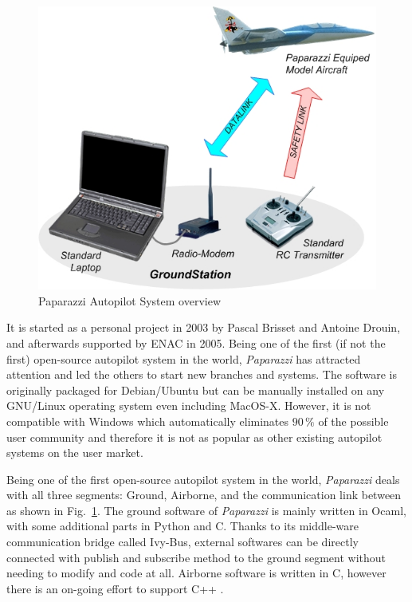 \begin{figure}[!hbt]
\begin{center}
\includegraphics[width=11.3cm]{figures/Paparazzi_System_overview}
\caption{Paparazzi Autopilot System overview} 
\label{fig:Paparazzi_System_overview}
\end{center}
\end{figure}

It is started as a personal project in 2003 by Pascal Brisset and Antoine Drouin, and afterwards supported by ENAC in 2005. 
Being one of the first (if not the first) open-source autopilot system in the world, \emph{Paparazzi} has attracted attention and led the others to start new branches and systems. %
The software is originally packaged for Debian/Ubuntu but can be manually installed on any GNU/Linux operating system even including MacOS-X. 
However, it is not compatible with Windows which automatically eliminates $90\,\%$ of the possible user community and therefore it is not as popular as other existing autopilot systems on the user market.

Being one of the first open-source autopilot system in the world, \emph{Paparazzi} deals with all three segments: Ground, Airborne, and the communication link between as shown in Fig.~\ref{fig:Paparazzi_System_overview}. 
The ground software of \emph{Paparazzi} is mainly written in Ocaml, with some additional parts in Python and C. 
Thanks to its middle-ware communication bridge called Ivy-Bus, external softwares can be directly connected with publish and subscribe method to the ground segment without needing to modify and code at all.
Airborne software is written in C, however there is an on-going effort to support C++ \cite{baskaya2016flexible}.

